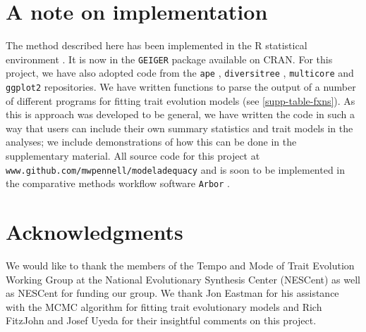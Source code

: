 \documentclass[12pt]{article}
\begin{document}
\section{A note on implementation}

The method described here has been implemented in the R statistical environment \citep{R}. It is now in the \texttt{GEIGER} package \citep{geiger} available on CRAN. For this project, we have also adopted code from the \texttt{ape} \citep{ape}, \texttt{diversitree} \citep{FitzJohn2012}, \texttt{multicore} \citep{multicore} and \texttt{ggplot2} \citep{ggplot2} repositories. We have written functions to parse the output of a number of different programs for fitting trait evolution models (see \ref{supp-table-fxns}). As this is approach was developed to be general, we have written the code in such a way that users can include their own summary statistics and trait models in the analyses; we include demonstrations of how this can be done in the supplementary material. All source code for this project at \texttt{www.github.com/mwpennell/modeladequacy} and is soon to be implemented in the comparative methods workflow software \texttt{Arbor} \citep{HarmonArbor}. 

\section{Acknowledgments}

We would like to thank the members of the Tempo and Mode of Trait Evolution Working Group at the National Evolutionary Synthesis Center (NESCent) as well as NESCent for funding our group. We thank Jon Eastman for his assistance with the MCMC algorithm for fitting trait evolutionary models and Rich FitzJohn and Josef Uyeda for their insightful comments on this project.



\newpage


\end{document}
